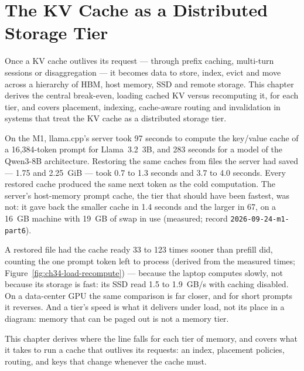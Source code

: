 \chapter{The KV Cache as a Distributed Storage Tier}\label{ch:kv-storage-tier}

\begin{ChapterIntent}
Once a KV cache outlives its request --- through prefix caching,
multi-turn sessions or disaggregation --- it becomes data to store, index,
evict and move across a hierarchy of HBM, host memory, SSD and remote storage.
This chapter derives the central break-even, loading cached KV versus
recomputing it, for each tier, and covers placement, indexing, cache-aware
routing and invalidation in systems that treat the KV cache as a distributed
storage tier.
\end{ChapterIntent}


On the M1, llama.cpp's server took 97 seconds to compute the key/value cache
of a 16,384-token prompt for Llama~3.2~3B, and 283 seconds for a model of the
Qwen3-8B architecture. Restoring the same caches from files the server had
saved --- 1.75 and 2.25~GiB --- took 0.7 to 1.3 seconds and 3.7 to 4.0 seconds.
Every restored cache produced the same next token as the cold computation. The
server's host-memory prompt cache, the tier that should have been fastest, was
not: it gave back the smaller cache in 1.4 seconds and the larger in 67, on a
16~GB machine with 19~GB of swap in use (measured; record
\texttt{2026-09-24-m1-part6}).

A restored file had the cache ready 33 to 123 times sooner than prefill did,
counting the one prompt token left to process (derived from the measured times;
Figure~\ref{fig:ch34-load-recompute}) --- because the laptop computes slowly, not because its
storage is fast: its SSD read 1.5 to 1.9~GB/s with caching disabled. On a
data-center GPU the same comparison is far closer, and for short prompts it
reverses. And a tier's speed is what it delivers under load, not its place in
a diagram: memory that can be paged out is not a memory tier.

 This chapter derives where the line falls for each tier of memory,
and covers what it takes to run a cache that outlives its requests: an index,
placement policies, routing, and keys that change whenever the cache must.

